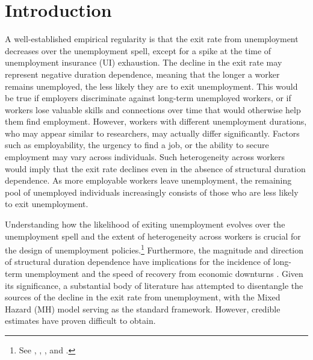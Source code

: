 \documentclass{div}
\begin{document}

\clearpage
\section{Introduction}

A well-established empirical regularity is that the exit rate from unemployment decreases over the unemployment spell, except for a spike at the time of unemployment insurance (UI) exhaustion. The decline in the exit rate may represent negative duration dependence, meaning that the longer a worker remains unemployed, the less likely they are to exit unemployment. This would be true if employers discriminate against long-term unemployed workers, or if workers lose valuable skills and connections over time that would otherwise help them find employment. However, workers with different unemployment durations, who may appear similar to researchers, may actually differ significantly. Factors such as employability, the urgency to find a job, or the ability to secure employment may vary across individuals. Such heterogeneity across workers would imply that the exit rate declines even in the absence of structural duration dependence.  As more employable workers leave unemployment, the remaining pool of unemployed individuals increasingly consists of those who are less likely to exit unemployment.

Understanding how the likelihood of exiting unemployment evolves over the unemployment spell and the extent of heterogeneity across workers is crucial for the design of unemployment policies.\footnote{See \cite{ShimerWerning2006}, \cite{PavoniViolante2007}, \cite{Pavoni2009}, and \cite{KolsrudEtAl2018}.} Furthermore, the magnitude and direction of structural duration dependence have implications for the incidence of long-term unemployment and the speed of recovery from economic downturns \citep{Pissarides1992}. Given its significance, a substantial body of literature has attempted to disentangle the sources of the decline in the exit rate from unemployment, with the Mixed Hazard (MH) model \citep{Lancaster1979} serving as the standard framework. However, credible estimates have proven difficult to obtain.
\end{document}
